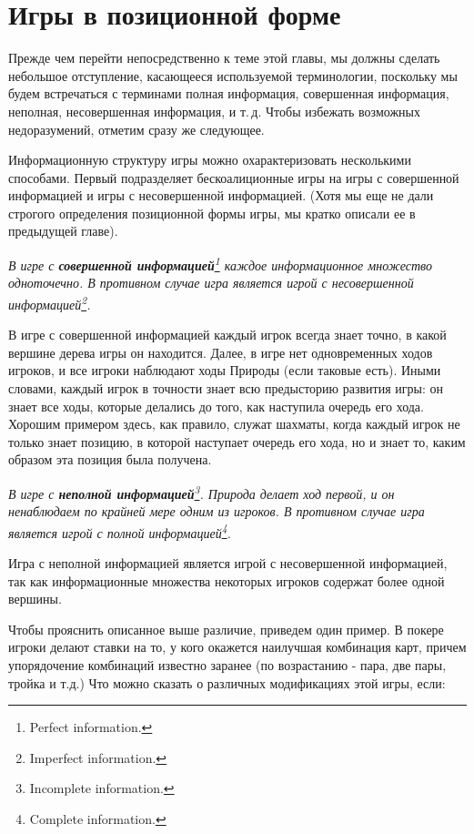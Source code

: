 \section{Игры в позиционной форме }

Прежде чем перейти непосредственно к теме этой главы, мы должны
сделать небольшое отступление, касающееся используемой терминологии,
поскольку мы
будем встречаться с терминами полная информация, совершенная
информация, неполная, несовершенная информация, и т.\,д. Чтобы
избежать возможных недоразумений, отметим сразу же следующее.

Информационную структуру игры можно охарактеризовать несколькими
способами. Первый подразделяет бескоалиционные игры на игры с
совершенной информацией и игры с несовершенной информацией. (Хотя
мы еще не дали строгого определения позиционной формы игры, мы
кратко описали ее в предыдущей главе).

{\it В игре с {\bf совершенной информацией}\footnote{ Perfect
information.} каждое информационное множество одноточечно.  В
противном случае игра является игрой с несовершенной
информацией\footnote{ Imperfect information.}.}

В игре с совершенной информацией каждый игрок всегда знает точно,
в какой вершине дерева игры он находится. Далее, в игре нет
одновременных ходов игроков, и все игроки наблюдают ходы Природы
(если таковые есть). Иными словами, каждый игрок в точности знает
всю предысторию развития игры: он знает все ходы, которые делались
до того, как наступила очередь его хода. Хорошим примером здесь,
как правило, служат шахматы, когда каждый игрок не только знает
позицию, в которой наступает очередь его хода, но и знает то,
каким образом эта позиция была получена.

{\it В игре с {\bf неполной информацией}\footnote{ Incomplete
information.}. Природа делает ход первой, и он ненаблюдаем по
крайней мере одним из игроков. В противном случае игра является
игрой с полной информацией\footnote{ Complete information.}.}

Игра с неполной информацией является игрой с несовершенной
информацией, так как информационные множества некоторых игроков
содержат более одной вершины.

Чтобы прояснить описанное выше различие, приведем один пример. В
покере игроки делают ставки на то, у кого окажется наилучшая
комбинация карт, причем упорядочение комбинаций известно заранее (по
возрастанию - пара, две пары, тройка и т.д.) Что можно сказать о
различных модификациях этой игры, если:

